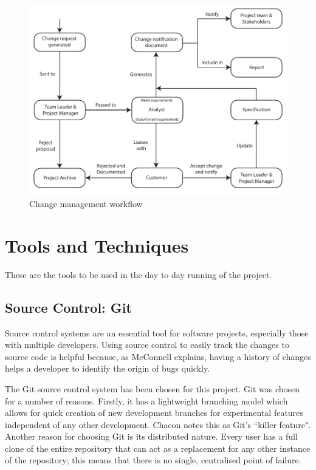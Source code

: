 \begin{fullwidth}
\begin{figure}[h!]
	\label{change_management_diagram}
	\includegraphics{res/change_management_diagram}
	\caption{Change management workflow}
\end{figure}

\section{Tools and Techniques}

These are the tools to be used in the day to day running of the project.

\subsection{Source Control: Git}

Source control systems are an essential tool for software projects, especially those
with multiple developers. Using source control to easily track the changes to source
code is helpful because, as McConnell explains, having a history of changes helps a
developer to identify the origin of bugs quickly.

The Git source control system has been chosen for this project.
Git was chosen for a number of reasons. Firstly, it has a lightweight branching model which
allows for quick creation of new development branches for experimental features independent of
any other development. Chacon notes this as Git's ``killer feature".
Another reason for choosing Git is its distributed nature. Every user has a full clone of the
entire repository that can act as a replacement for any other instance of the repository; this means
that there is no single, centralised point of failure.


\end{fullwidth}
